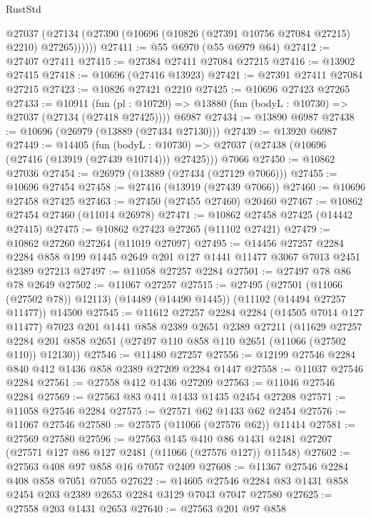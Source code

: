 \begin{lexlean}{RustStd}
\begin{coremodule}
        @27037 (@27134 (@27390 (@10696 (@10826 (@27391 @10756 @27084 @27215) @2210) @27265))))))
@27411 := @55 @6970 (@55 @6979 @64)
@27412 := @27407 @27411
@27415 := @27384 @27411 @27084 @27215
@27416 := @13902 @27415
@27418 := @10696 (@27416 @13923)
@27421 := @27391 @27411 @27084 @27215
@27423 := @10826 @27421 @2210
@27425 := @10696 @27423 @27265
@27433 := @10911
    (fun (pl : @10720) => @13880 (fun (bodyL : @10730) => @27037 (@27134 (@27418 @27425))))
    @6987
@27434 := @13890 @6987
@27438 := @10696 (@26979 (@13889 (@27434 @27130)))
@27439 := @13920 @6987
@27449 := @14405
    (fun (bodyL : @10730) => @27037 (@27438 (@10696 (@27416 (@13919 (@27439 @10714))) @27425)))
    @7066
@27450 := @10862 @27036
@27454 := @26979 (@13889 (@27434 (@27129 @7066)))
@27455 := @10696 @27454
@27458 := @27416 (@13919 (@27439 @7066))
@27460 := @10696 @27458 @27425
@27463 := @27450 (@27455 @27460) @20460
@27467 := @10862 @27454 @27460 (@11014 @26978)
@27471 := @10862 @27458 @27425 (@14442 @27415)
@27475 := @10862 @27423 @27265 (@11102 @27421)
@27479 := @10862 @27260 @27264 (@11019 @27097)
@27495 := @14456
    @27257
    @2284
    @2284
    @858
    @199
    @1445
    @2649
    @201
    @127
    @1441
    @11477
    @3067
    @7013
    @2451
    @2389
    @27213
@27497 := @11058 @27257 @2284
@27501 := @27497 @78 @86 @78 @2649
@27502 := @11067 @27257
@27515 := @27495
    (@27501 (@11066 (@27502 @78)) @12113)
    (@14489 (@14490 @1445))
    (@11102 (@14494 @27257 @11477))
    @14500
@27545 := @11612
    @27257
    @2284
    @2284
    (@14505 @7014 @127 @11477)
    @7023
    @201
    @1441
    @858
    @2389
    @2651
    @2389
    @27211
    (@11629
      @27257
      @2284
      @201
      @858
      @2651
      (@27497 @110 @858 @110 @2651 (@11066 (@27502 @110)) @12130))
@27546 := @11480 @27257
@27556 := @12199 @27546 @2284 @840 @412 @1436 @858 @2389 @27209 @2284 @1447
@27558 := @11037 @27546 @2284
@27561 := @27558 @412 @1436 @27209
@27563 := @11046 @27546 @2284
@27569 := @27563 @83 @411 @1433 @1435 @2454 @27208
@27571 := @11058 @27546 @2284
@27575 := @27571 @62 @1433 @62 @2454
@27576 := @11067 @27546
@27580 := @27575 (@11066 (@27576 @62)) @11414
@27581 := @27569 @27580
@27596 := @27563
    @145
    @410
    @86
    @1431
    @2481
    @27207
    (@27571 @127 @86 @127 @2481 (@11066 (@27576 @127)) @11548)
@27602 := @27563 @408 @97 @858 @16 @7057 @2409
@27608 := @11367 @27546 @2284 @408 @858 @7051 @7055
@27622 := @14605 @27546 @2284 @83 @1431 @858 @2454 @203 @2389 @2653 @2284 @3129 @7043 @7047 @27580
@27625 := @27558 @203 @1431 @2653
@27640 := @27563
    @201
    @97
    @858

\end{coremodule}
\end{lexlean}
